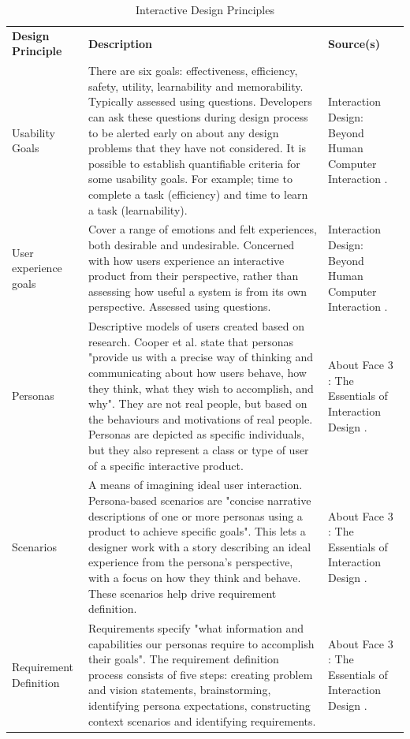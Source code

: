\documentclass[authoryearcitations]{UoYCSproject}
\begin{document}
\begin{table}[tbp]
   \caption{Interactive Design Principles}
  \begin{tabular}{ p{2.0cm}  p{9.0cm}  p{3.0cm}   }
      \textbf{Design Principle} & \textbf{Description} & \textbf{Source(s)} 
    \\Usability Goals & There are six goals: effectiveness, efficiency, safety, utility, learnability and memorability. Typically assessed using questions. Developers can ask these questions during design process to be alerted early on about any design problems that they have not considered. It is possible to establish quantifiable criteria for some usability goals. For example; time to complete a task (efficiency) and time to learn a task (learnability).  &  Interaction Design: Beyond Human Computer Interaction \citep{Rogers2011}.
     \\User experience goals & Cover a range of emotions and felt experiences, both desirable and undesirable. Concerned with how users experience an interactive product from their perspective, rather than assessing how useful a system is from its own perspective. Assessed using questions.  &  Interaction Design: Beyond Human Computer Interaction \citep{Rogers2011}.
       \\Personas & Descriptive models of users created based on research. Cooper et al. state that personas "provide us with a precise way of thinking and communicating about how users behave, how they think, what they wish to accomplish, and why". They are not real people, but based on the behaviours and motivations of real people. Personas are depicted as specific individuals, but they also represent a class or type of user of a specific interactive product.  &  About Face 3 : The Essentials of Interaction Design \citep{Cooper2007}.
       \\Scenarios & A means of imagining ideal user interaction. Persona-based scenarios are "concise narrative descriptions of one or more personas using a product to achieve specific goals". This lets a designer work with a story describing an ideal experience from the persona's perspective, with a focus on how they think and behave. These scenarios help drive requirement definition.  &  About Face 3 : The Essentials of Interaction Design \citep{Cooper2007}.
       \\Requirement Definition & Requirements specify "what information and capabilities our personas require to accomplish their goals". The requirement definition process consists of five steps: creating problem and vision statements, brainstorming, identifying persona expectations, constructing context scenarios and identifying requirements. &  About Face 3 : The Essentials of Interaction Design \citep{Cooper2007}.
  \end{tabular}
  \label{tab:designprinciples}
\end{table}
\end{document}
